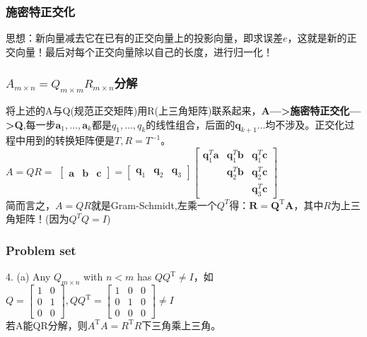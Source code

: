 \documentclass[UTF8]{article}
\begin{document}
    \subsubsection{施密特正交化}
    思想：新向量减去它在已有的正交向量上的投影向量，即求误差$e$，这就是新的正交向量！最后对每个正交向量除以自己的长度，进行归一化！
    \subsubsection{$A_{m\times n}=Q_{m\times m}R_{m\times n}$分解}
    将上述的A与Q(规范正交矩阵)用R(上三角矩阵)联系起来，\textbf{A--->施密特正交化--->Q},每一步$\boldsymbol{a}_{1}, \dots, \boldsymbol{a}_{k}$都是$q_{1}, \ldots, q_{k}$的线性组合，后面的$\bm{q}_{k+1}...$均不涉及。正交化过程中用到的转换矩阵便是$T,R=T^{-1}$。
    \\
    $A=Q R=$
    $\left[\begin{array}{lll}{\bm{a}} & {\bm{b}} & {\bm{c}}\end{array}\right]=\left[\begin{array}{lll}{\bm{q}_{1}} & {\bm{q}_{2}} & {\bm{q}_{3}}\end{array}\right]\left[\begin{array}{ccc}{\bm{q}_{1}^{T} \bm{a}} & {\bm{q}_{1}^{T} \bm{b}} & {\bm{q}_{1}^{T} \bm{c}} \\ {} & {\bm{q}_{2}^{T} \bm{b}} & {\bm{q}_{2}^{T} \bm{c}} \\ {} & {} & {\bm{q}_{3}^{T} \bm{c}}\end{array}\right]$
    \\
    简而言之，$A=Q R$就是Gram-Schmidt,左乘一个$Q^T$得：$\boldsymbol{R}=\boldsymbol{Q}^{\mathrm{T}} \boldsymbol{A}$，其中$R$为上三角矩阵！(因为$Q^T Q = I$)
    
    \subsubsection{Problem set}
    4. (a) Any $Q_{m\times n}$ with $n<m$ has $Q Q^{\mathrm{T}} \neq I$，如$Q=\left[\begin{array}{ll}{1} & {0} \\ {0} & {1} \\ {0} & {0}\end{array}\right], Q Q^{\mathrm{T}}=\left[\begin{array}{ccc}{1} & {0} & {0} \\ {0} & {1} & {0} \\ {0} & {0} & {0}\end{array}\right] \neq I$
    \\
    若A能QR分解，则$A^{\mathrm{T}} A=R^{\mathrm{T}} R$下三角乘上三角。
\end{document}
